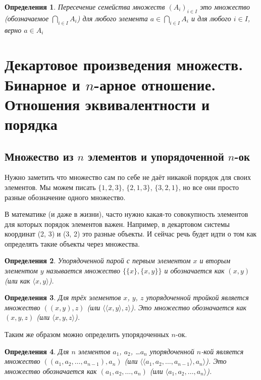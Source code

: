\documentclass[a4paper, 16pt, oneside]{book}
\newtheorem{Definition}{Определения}[theorem]
\begin{document}
\begin{Definition}
    \label{definiton:intersect_set_families}
    Пересечение семейства множеств \((A_i)_{i \in I}\) это множество
    (обозначаемое \(\underset{i \in I}{\bigcap} A_i\)) для любого элемента \(a \in \underset{i \in I}{\bigcap} A_i\)
    и для любого \(i \in I\), верно \(a \in A_i\)
\end{Definition}

\section{Декартовое произведения множеств. Бинарное и \(n\)-арное отношение. Отношения эквивалентности и порядка}

\subsection {Множество из \(n\) элементов и упорядоченной \(n\)-ок}
\par Нужно заметить что множество сам по себе не даёт никакой порядок для своих элементов.
Мы можем писать \(\{1, 2, 3\}\), \(\{2, 1, 3\}\), \(\{3, 2, 1\}\), но все они просто разные обозначение одного множество.
\par В математике (и даже в жизни), часто нужно какая-то совокупность элементов для которых порядок элементов важен.
Например, в декартовом системы координат (2, 3) и (3, 2) это разные объекты. И сейчас речь будет идти о том как определять такие объекты через множества.

\begin{Definition}
    \label{definiton:ordered_pair}
    Упорядоченной парой с первым элементом \(x\) и вторым элементом \(y\) называется множество \(\{\{x\}, \{x, y\}\}\)
    и обозначается как \((x, y)\) (или как \(\langle x, y\rangle\)).
\end{Definition}

\begin{Definition}
    \label{definiton:orderen_3}
    Для трёх элементов \(x\), \(y\), \(z\) упорядоченной тройкой является множество \(((x, y), z)\) (или \(\langle\langle x, y \rangle, z\rangle\)).
    Это множество обозначается как \((x, y, z)\) (или \(\langle x, y, z \rangle\)).
\end{Definition}

\par Таким же образом можно определить упорядоченных \(n\)-ок.

\begin{Definition}
    \label{definiton:orderen_n}
    Для \(n\) элементов \(a_1\), \(a_2\), \ldots \(a_n\) упорядоченной \(n\)-кой является множество \(((a_1, a_2, \ldots, a_{n - 1}), a_n)\)
    (или \(\langle\langle a_1, a_2, \ldots, a_{n - 1}\rangle, a_n \rangle\)).
    Это множество обозначается как \((a_1, a_2, \ldots, a_n)\) (или \(\langle a_1, a_2, \ldots, a_n \rangle\)).
\end{Definition}
\end{document}
